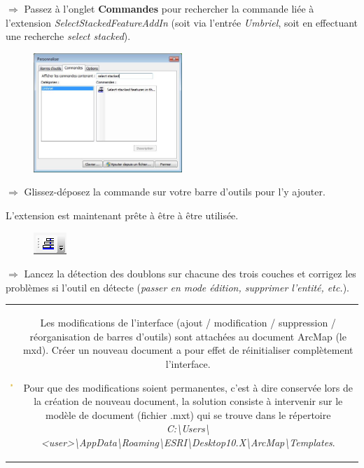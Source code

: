 \documentclass[11pt]{article}
\newcommand{\action}{$\Rightarrow$ }
\newenvironment{note}{%
	\begin{tabular}[t t]{c c}
		\includegraphics{img/tips.png}
		 &
		\begin{minipage}[c]{0.9\linewidth}
			\begin{sffamily}
}{%
			\end{sffamily}
		\end{minipage}
	\end{tabular}
}
\begin{document}
\action Passez à l'onglet \textbf{Commandes} pour rechercher la commande liée à l'extension \textit{SelectStackedFeatureAddIn} (soit via l'entrée \textit{Umbriel}, soit en effectuant une recherche \textit{select stacked}).
\begin{figure}[H]
	\center \includegraphics[width=0.5\textwidth]{img/cours3/am_fenetre_personnaliser-2.png} \\
\end{figure}

\action Glissez-déposez la commande sur votre barre d'outils pour l'y ajouter.

L'extension est maintenant prête à être à être utilisée.
\begin{figure}[H]
	\center \includegraphics{img/cours3/am_detection_doublons.png} \\
\end{figure}

\action Lancez la détection des doublons sur chacune des trois couches et corrigez les problèmes si l'outil en détecte (\textit{passer en mode édition, supprimer l'entité, etc.}).

\begin{note}
Les modifications de l'interface (ajout / modification / suppression / réorganisation de barres d'outils) sont attachées au document ArcMap (le mxd). Créer un nouveau document a pour effet de réinitialiser complètement l'interface.

Pour que des modifications soient permanentes, c'est à dire conservée lors de la création de nouveau document, la solution consiste à intervenir sur le modèle de document (fichier .mxt) qui se trouve dans le répertoire \textit{C:\textbackslash{}Users\textbackslash{}<user>\textbackslash{}AppData\textbackslash{}Roaming\textbackslash{}ESRI\textbackslash{}Desktop10.X\textbackslash{}ArcMap\textbackslash{}Templates}.
\end{note}
\end{document}

